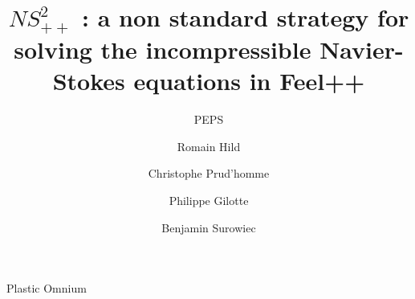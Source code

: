 \documentclass{beamer}
\title[$NS^2_{++}$]{$NS^2_{++}$ : a non standard strategy for solving the incompressible Navier-Stokes equations in Feel++}
\subtitle{PEPS}
\author[Romain Hild]{Romain Hild \inst{1} \and Christophe Prud'homme \inst{1}\\ \and Philippe Gilotte \inst{2} \and Benjamin Surowiec \inst{2}}
\institute[shortinst]{\inst{1} Université de Strasbourg \and \inst{2} Plastic Omnium}
\begin{document}
\begin{frame}
\titlepage
\end{frame}

\begin{frame}{Plastic Omnium}
\end{frame}
\end{document}
